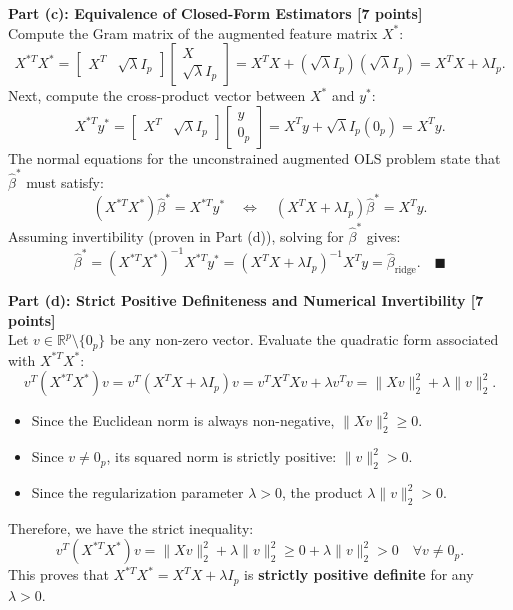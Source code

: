 \documentclass[11pt,a4paper]{article}
\begin{document}
\vspace{4pt}
\textbf{Part (c): Equivalence of Closed-Form Estimators [7 points]} \\
Compute the Gram matrix of the augmented feature matrix $X^*$:
\[
  X^{*T} X^* = \begin{bmatrix} X^T & \sqrt{\lambda} I_p \end{bmatrix} \begin{bmatrix} X \\ \sqrt{\lambda} I_p \end{bmatrix} = X^T X + (\sqrt{\lambda} I_p)(\sqrt{\lambda} I_p) = X^T X + \lambda I_p.
\]
Next, compute the cross-product vector between $X^*$ and $y^*$:
\[
  X^{*T} y^* = \begin{bmatrix} X^T & \sqrt{\lambda} I_p \end{bmatrix} \begin{bmatrix} y \\ 0_p \end{bmatrix} = X^T y + \sqrt{\lambda} I_p (0_p) = X^T y.
\]
The normal equations for the unconstrained augmented OLS problem state that $\hat{\beta}^*$ must satisfy:
\[
  (X^{*T} X^*) \hat{\beta}^* = X^{*T} y^* \quad \Longleftrightarrow \quad (X^T X + \lambda I_p) \hat{\beta}^* = X^T y.
\]
Assuming invertibility (proven in Part (d)), solving for $\hat{\beta}^*$ gives:
\[
  \hat{\beta}^* = (X^{*T} X^*)^{-1} X^{*T} y^* = (X^T X + \lambda I_p)^{-1} X^T y = \hat{\beta}_{\text{ridge}}. \quad \blacksquare
\]

\vspace{4pt}
\textbf{Part (d): Strict Positive Definiteness and Numerical Invertibility [7 points]} \\
Let $v \in \mathbb{R}^p \setminus \{0_p\}$ be any non-zero vector. Evaluate the quadratic form associated with $X^{*T} X^*$:
\[
  v^T (X^{*T} X^*) v = v^T (X^T X + \lambda I_p) v = v^T X^T X v + \lambda v^T v = \|X v\|_2^2 + \lambda \|v\|_2^2.
\]
\begin{itemize}[itemsep=2pt, leftmargin=18pt]
  \item Since the Euclidean norm is always non-negative, $\|X v\|_2^2 \ge 0$.
  \item Since $v \ne 0_p$, its squared norm is strictly positive: $\|v\|_2^2 > 0$.
  \item Since the regularization parameter $\lambda > 0$, the product $\lambda \|v\|_2^2 > 0$.
\end{itemize}
Therefore, we have the strict inequality:
\[
  v^T (X^{*T} X^*) v = \|X v\|_2^2 + \lambda \|v\|_2^2 \ge 0 + \lambda \|v\|_2^2 > 0 \quad \forall v \ne 0_p.
\]
This proves that $X^{*T} X^* = X^T X + \lambda I_p$ is \textbf{strictly positive definite} for any $\lambda > 0$.
\end{document}

